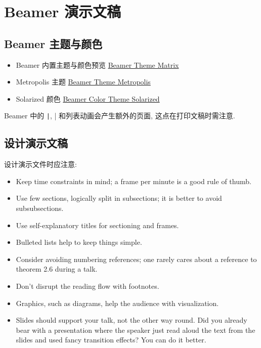 \chapter{Beamer 演示文稿}

\section{Beamer 主题与颜色}

\begin{itemize}
  \item Beamer 内置主题与颜色预览 \href{https://mpetroff.net/files/beamer-theme-matrix/}{Beamer Theme Matrix}
  \item Metropolis 主题 \href{https://github.com/matze/mtheme}{Beamer Theme Metropolis}
  \item Solarized 颜色 \href{https://github.com/jrnold/beamercolorthemesolarized}{Beamer Color Theme Solarized}
\end{itemize}

Beamer 中的 \texttt|\pause, \pausesections| 和列表动画会产生额外的页面, 这点在打印文稿时需注意.

\section{设计演示文稿}

设计演示文件时应注意:

\begin{itemize}
  \item Keep time constraints in mind; a frame per minute is a good rule of thumb.
  \item Use few sections, logically split in subsections; it is better to avoid subsubsections.
  \item Use self-explanatory titles for sectioning and frames.
  \item Bulleted lists help to keep things simple.
  \item Consider avoiding numbering references; one rarely cares about a
reference to theorem 2.6 during a talk.
  \item Don't disrupt the reading flow with footnotes.
  \item Graphics, such as diagrams, help the audience with visualization.   
  \item Slides should support your talk, not the other way round. Did you
already bear with a presentation where the speaker just read aloud the text from the slides and used fancy transition effects? You can do it better.
\end{itemize}
